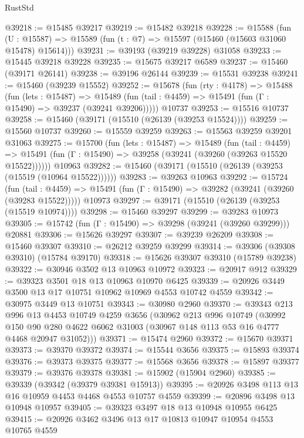 \begin{lexlean}{RustStd}
\begin{coremodule}
@39218 := @15485 @39217
@39219 := @15482 @39218
@39228 := @15588
    (fun (U : @15587) => @15589 (fun (t : @7) => @15597 (@15460 (@15603 @31060 @15478) @15614)))
@39231 := @39193 (@39219 @39228) @31058
@39233 := @15445 @39218 @39228
@39235 := @15675 @39217 @6589
@39237 := @15460 (@39171 @26141)
@39238 := @39196 @26144
@39239 := @15531 @39238
@39241 := @15460 (@39239 @15552)
@39252 := @15678
    (fun (rty : @4178) =>
    @15488
      (fun (lets : @15487) =>
      @15489 (fun (tail : @4459) => @15491 (fun (Γ : @15490) => @39237 (@39241 @39206)))))
    @10737
@39253 := @15516 @10737
@39258 := @15460 (@39171 (@15510 (@26139 (@39253 @15524))))
@39259 := @15560 @10737
@39260 := @15559 @39259
@39263 := @15563 @39259 @39201 @31063
@39275 := @15700
    (fun (lets : @15487) =>
    @15489
      (fun (tail : @4459) =>
      @15491 (fun (Γ : @15490) => @39258 (@39241 (@39260 (@39263 @15520 @15522))))))
    @10963
@39282 := @15460 (@39171 (@15510 (@26139 (@39253 (@15519 (@10964 @15522))))))
@39283 := @39263 @10963
@39292 := @15724
    (fun (tail : @4459) => @15491 (fun (Γ : @15490) => @39282 (@39241 (@39260 (@39283 @15522)))))
    @10973
@39297 := @39171 (@15510 (@26139 (@39253 (@15519 @10974))))
@39298 := @15460 @39297
@39299 := @39283 @10973
@39305 := @15742 (fun (Γ : @15490) => @39298 (@39241 (@39260 @39299))) @20881
@39306 := @15626 @39297
@39307 := @39239 @26209
@39308 := @15460 @39307
@39310 := @26212 @39259 @39299
@39314 := @39306 (@39308 @39310) (@15784 @39170)
@39318 := @15626 @39307 @39310 (@15789 @39238)
@39322 := @30946 @3502 @13 @10963 @10972
@39323 := @20917 @912
@39329 := @39323 @3501 @18 @13 @10963 @10970 @6425
@39339 := @20926 @3449 @3500 @13 @17 @10751 @10962 @10969 @4553 @10742 @4559
@39342 := @30975 @3449 @13 @10751
@39343 := @30980 @2960
@39370 := @39343
    @213
    @996
    @13
    @4453
    @10749
    @4259
    @3656
    (@30962
      @213
      @996
      @10749
      (@30992
        @150
        @90
        @280
        @4622
        @6062
        @31003
        (@30967 @148 @113 @53 @16 @4777 @4468 @20947 @31052)))
@39371 := @15474 @2960
@39372 := @15670 @39371
@39373 := @39370 @39372
@39374 := @15544 @3656
@39375 := @15893 @39374
@39376 := @39373 @39375
@39377 := @15568 @3656
@39378 := @15897 @39377
@39379 := @39376 @39378
@39381 := @15902 (@15904 @2960)
@39385 := @39339 (@39342 (@39379 @39381 @15913))
@39395 := @20926 @3498 @113 @13 @16 @10959 @4453 @4468 @4553 @10757 @4559
@39399 := @20896 @3498 @13 @10948 @10957
@39405 := @39323 @3497 @18 @13 @10948 @10955 @6425
@39415 := @20926 @3462 @3496 @13 @17 @10813 @10947 @10954 @4553 @10765 @4559

\end{coremodule}
\end{lexlean}
